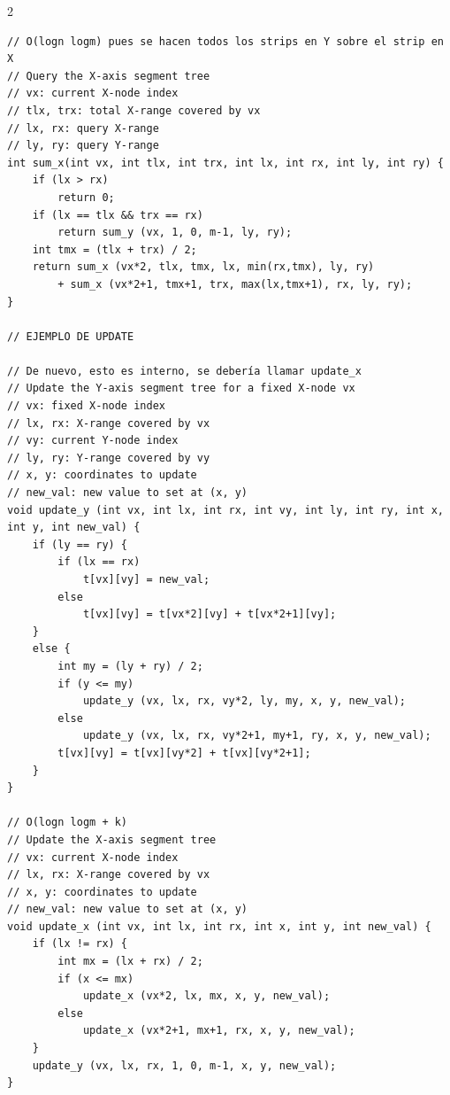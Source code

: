 \documentclass[twoside]{article}
\begin{document}
\begin{multicols*}{2}
\begin{verbatim}
// O(logn logm) pues se hacen todos los strips en Y sobre el strip en X
// Query the X-axis segment tree
// vx: current X-node index
// tlx, trx: total X-range covered by vx
// lx, rx: query X-range
// ly, ry: query Y-range
int sum_x(int vx, int tlx, int trx, int lx, int rx, int ly, int ry) {
	if (lx > rx)
		return 0;
	if (lx == tlx && trx == rx)
		return sum_y (vx, 1, 0, m-1, ly, ry);
	int tmx = (tlx + trx) / 2;
	return sum_x (vx*2, tlx, tmx, lx, min(rx,tmx), ly, ry)
		+ sum_x (vx*2+1, tmx+1, trx, max(lx,tmx+1), rx, ly, ry);
}

// EJEMPLO DE UPDATE

// De nuevo, esto es interno, se debería llamar update_x
// Update the Y-axis segment tree for a fixed X-node vx
// vx: fixed X-node index
// lx, rx: X-range covered by vx
// vy: current Y-node index
// ly, ry: Y-range covered by vy
// x, y: coordinates to update
// new_val: new value to set at (x, y)
void update_y (int vx, int lx, int rx, int vy, int ly, int ry, int x, int y, int new_val) {
	if (ly == ry) {
		if (lx == rx)
			t[vx][vy] = new_val;
		else
			t[vx][vy] = t[vx*2][vy] + t[vx*2+1][vy];
	}
	else {
		int my = (ly + ry) / 2;
		if (y <= my)
			update_y (vx, lx, rx, vy*2, ly, my, x, y, new_val);
		else
			update_y (vx, lx, rx, vy*2+1, my+1, ry, x, y, new_val);
		t[vx][vy] = t[vx][vy*2] + t[vx][vy*2+1];
	}
}
 
// O(logn logm + k)
// Update the X-axis segment tree
// vx: current X-node index
// lx, rx: X-range covered by vx
// x, y: coordinates to update
// new_val: new value to set at (x, y)
void update_x (int vx, int lx, int rx, int x, int y, int new_val) {
	if (lx != rx) {
		int mx = (lx + rx) / 2;
		if (x <= mx)
			update_x (vx*2, lx, mx, x, y, new_val);
		else
			update_x (vx*2+1, mx+1, rx, x, y, new_val);
	}
	update_y (vx, lx, rx, 1, 0, m-1, x, y, new_val);
}

\end{verbatim}

	{
}
\end{multicols*}
\end{document}
